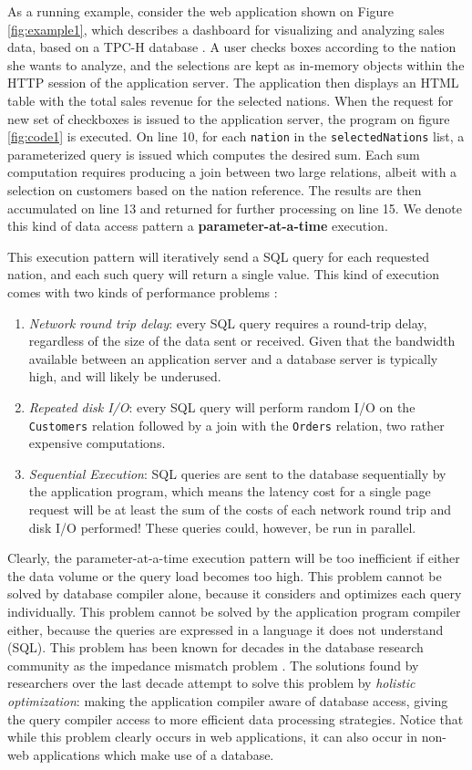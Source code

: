 As a running example, consider the web application shown on Figure \ref{fig:example1}, which describes a dashboard for visualizing and analyzing sales data, based on a TPC-H database \cite{tpch}. A user checks boxes according to the nation she wants to analyze, and the selections are kept as in-memory objects within the HTTP session of the application server. The application then displays an HTML table with the total sales revenue for the selected nations. When the request for new set of checkboxes is issued to the application server, the program on figure \ref{fig:code1} is executed. On line 10, for each \texttt{nation} in the \texttt{selectedNations} list, a parameterized query is issued which computes the desired sum. Each sum computation requires producing a join between two large relations, albeit with a selection on customers based on the nation reference. The results are then accumulated on line 13 and returned for further processing on line 15. We denote this kind of data access pattern a \textbf{parameter-at-a-time} execution.

This execution pattern will iteratively send a SQL query for each requested nation, and each such query will return a single value. This kind of execution comes with two kinds of performance problems : 
\begin{enumerate}
\item{\emph{Network round trip delay}: every SQL query requires a round-trip delay, regardless of the size of the data sent or received. Given that the bandwidth available between an application server and a database server is typically high, and will likely be underused.}
\item{\emph{Repeated disk I/O}:  every SQL query will perform random I/O on the \texttt{Customers} relation followed by a join with the \texttt{Orders} relation, two rather expensive computations.}
\item{\emph{Sequential Execution}: SQL queries are sent to the database sequentially by the application program, which means the latency cost for a single page request will be at least the sum of the costs of each network round trip and disk I/O performed! These queries could, however, be run in parallel.}
\end{enumerate}

Clearly, the parameter-at-a-time execution pattern will be too inefficient if either the data volume or the query load becomes too high. This problem cannot be solved by database compiler alone, because it considers and optimizes each query individually. This problem cannot be solved by the application program compiler either, because the queries are expressed in a language it does not understand (SQL). This problem has been known for decades in the database research community as the impedance mismatch problem \cite{cook:2005aa, maier:1987aa}. The solutions found by researchers over the last decade attempt to solve this problem by \emph{holistic optimization}: making the application compiler aware of database access, giving the query compiler access to more efficient data processing strategies. Notice that while this problem clearly occurs in web applications, it can also occur in non-web applications which make use of a database.

